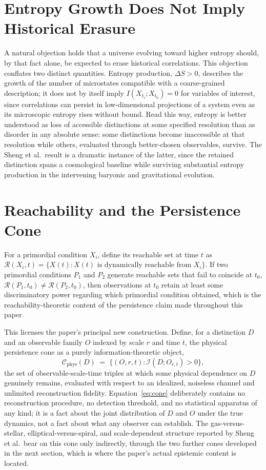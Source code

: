 \documentclass[11pt]{article}
\begin{document}
\section{Entropy Growth Does Not Imply Historical Erasure}

A natural objection holds that a universe evolving toward higher entropy should, by that fact alone, be expected to erase historical correlations. This objection conflates two distinct quantities. Entropy production, $\Delta S > 0$, describes the growth of the number of microstates compatible with a coarse-grained description; it does not by itself imply $I(X_{t_i}; X_{t_0}) = 0$ for variables of interest, since correlations can persist in low-dimensional projections of a system even as its microscopic entropy rises without bound. Read this way, entropy is better understood as loss of accessible distinctions at some specified resolution than as disorder in any absolute sense: some distinctions become inaccessible at that resolution while others, evaluated through better-chosen observables, survive. The Sheng et al.\ result is a dramatic instance of the latter, since the retained distinction spans a cosmological baseline while surviving substantial entropy production in the intervening baryonic and gravitational evolution.

\section{Reachability and the Persistence Cone}

For a primordial condition $X_i$, define its reachable set at time $t$ as $\mathcal R(X_i, t) = \{X(t) : X(t) \text{ is dynamically reachable from } X_i\}$. If two primordial conditions $P_1$ and $P_2$ generate reachable sets that fail to coincide at $t_0$, $\mathcal R(P_1, t_0) \neq \mathcal R(P_2, t_0)$, then observations at $t_0$ retain at least some discriminatory power regarding which primordial condition obtained, which is the reachability-theoretic content of the persistence claim made throughout this paper.

This licenses the paper's principal new construction. Define, for a distinction $D$ and an observable family $O$ indexed by scale $r$ and time $t$, the physical persistence cone as a purely information-theoretic object,
\begin{equation}
\mathcal C_{\mathrm{phys}}(D) \;=\; \big\{ (O, r, t) : \mathcal I\!\left(D; O_{r,t}\right) > 0 \big\},
\label{eq:cone}
\end{equation}
the set of observable-scale-time triples at which some physical dependence on $D$ genuinely remains, evaluated with respect to an idealized, noiseless channel and unlimited reconstruction fidelity. Equation~\eqref{eq:cone} deliberately contains no reconstruction procedure, no detection threshold, and no statistical apparatus of any kind; it is a fact about the joint distribution of $D$ and $O$ under the true dynamics, not a fact about what any observer can establish. The gas-versus-stellar, elliptical-versus-spiral, and scale-dependent structure reported by Sheng et al.\ bear on this cone only indirectly, through the two further cones developed in the next section, which is where the paper's actual epistemic content is located.
\end{document}
